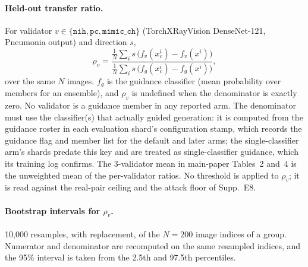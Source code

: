 \paragraph{Held-out transfer ratio.} For validator $v \in \{\texttt{nih}, \texttt{pc}, \texttt{mimic\_ch}\}$ (TorchXRayVision DenseNet-121, Pneumonia output) and direction $s$,
\begin{equation*}
\rho_v = \frac{\frac{1}{N}\sum_i s\,\big(f_v(x_c^i) - f_v(x^i)\big)}{\frac{1}{N}\sum_i s\,\big(f_g(x_c^i) - f_g(x^i)\big)},
\end{equation*}
over the same $N$ images. $f_g$ is the guidance classifier (mean probability over members for an ensemble), and $\rho_v$ is undefined when the denominator is exactly zero. No validator is a guidance member in any reported arm. The denominator must use the classifier(s) that actually guided generation: it is computed from the guidance roster in each evaluation shard's configuration stamp, which records the guidance flag and member list for the default and later arms; the single-classifier arm's shards predate this key and are treated as single-classifier guidance, which its training log confirms. The 3-validator mean in main-paper Tables~2 and~4 is the unweighted mean of the per-validator ratios. No threshold is applied to $\rho_v$; it is read against the real-pair ceiling and the attack floor of Supp.~E8.

\paragraph{Bootstrap intervals for $\rho_v$.} 10{,}000 resamples, with replacement, of the $N = 200$ image indices of a group. Numerator and denominator are recomputed on the same resampled indices, and the 95\% interval is taken from the 2.5th and 97.5th percentiles.

